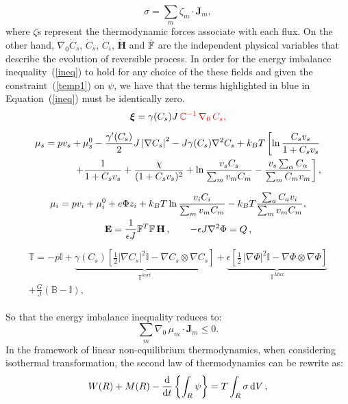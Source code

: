 \begin{equation}
\sigma = \sum_m \zeta_m \cdot \mathbf{J}_m,
\label{dis}
\end{equation}
where $\zeta$s represent the thermodynamic forces associate with each flux. On the other hand, $\nabla_0 \dot{C}_s$, $\dot{C}_s$, $\dot{C}_i$, $\mathbf{\dot{H}}$ and $\dot{\mathbb{F}}$ are the independent physical variables that describe the evolution of reversible process. In order for the energy imbalance inequality~(\ref{ineq}) to hold for any choice of the these fields and given the constraint~(\ref{temp1}) on $\psi$, we have that the terms highlighted in blue in Equation~(\ref{ineq}) must be identically zero. 
\begin{gather}
\boldsymbol{\xi} = \gamma(C_s) J \,\color{red}{\mathbb{C}^{-1}} \,\nabla_0 \,C_s,\label{sys1}\\[2mm]
\begin{aligned}
\mu_s = p v_s + \mu_s^0 -\frac{\gamma'(C_s)}{2} J \left|\nabla C_s\right|^2- J\gamma(C_s)\nabla^2 C_s+ k_BT\left[\ln \frac{C_s v_s}{1+C_s v_s} \right.\\
\left.+ \frac{1}{1+C_sv_s}
 +\frac{\chi}{(1+C_s v_s)^2} + \ln \frac{v_s C_s}{\sum_m v_mC_m} - \frac{v_s \sum_\alpha C_\alpha}{\sum_m C_m v_m} \right], 
\end{aligned}\label{gov1}\\[2.5mm]
\mu_i = p v_i + \mu^0_i + e\Phi z_i + k_BT \ln \frac{v_iC_i}{\sum_m v_m C_m} - k_BT \frac{\sum_a C_a v_i}{\sum_m v_m C_m},\label{mu}\\
\mathbf{E} = \frac{1}{\epsilon J} \mathbb{F}^T \mathbb{F}\, \mathbf{H}\, , \qquad -\epsilon J \nabla^2 \Phi = Q\, ,\label{sys2}
\end{gather}
\begin{gather}
\begin{aligned}
\mathbb{T}= -p \mathbb{I} + \underbrace{\gamma(C_s) \left[\frac{1}{2} |\nabla C_s|^2\mathbb{I} - \nabla C_s \otimes \nabla C_s\right]}_{\mathbb{T}^{kort}}+ \underbrace{\epsilon \left[\frac{1}{2} \,|\nabla \Phi|^2\mathbb{I} -\nabla \Phi \otimes \nabla \Phi\right]}_{\mathbb{T}^{Max}}\\
+ \frac{G}{J}\left(\mathbb{B}-\mathbb{I}\right),
\end{aligned}
\label{sys3}
\end{gather}

So that the energy imbalance inequality reduces to:
\begin{equation}
\sum_m \nabla_0 \,\mu_m \cdot \mathbf{J}_m \leq 0.
\end{equation}
In the framework of linear non-equilibrium thermodynamics, when considering isothermal transformation, the second law of thermodynamics can be rewrite as:
\begin{equation}
W(R)+M(R)-\frac{\text{d}}{\text{d} t} \left\{\int_R \psi \right\} = T \int_R \sigma \,\text{d} V\, ,
\label{eqCIT}
\end{equation}

